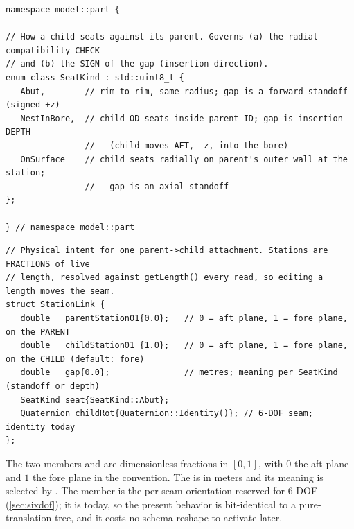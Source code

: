 \begin{listing}[htbp]
\begin{verbatim}
namespace model::part {

// How a child seats against its parent. Governs (a) the radial compatibility CHECK
// and (b) the SIGN of the gap (insertion direction).
enum class SeatKind : std::uint8_t {
   Abut,        // rim-to-rim, same radius; gap is a forward standoff (signed +z)
   NestInBore,  // child OD seats inside parent ID; gap is insertion DEPTH
                //   (child moves AFT, -z, into the bore)
   OnSurface    // child seats radially on parent's outer wall at the station;
                //   gap is an axial standoff
};

} // namespace model::part
\end{verbatim}
\caption{The  enum: three radial relationships, governing the radial check and the
gap sign.}\label{lst:seatkind}
\end{listing}

\begin{listing}[htbp]
\begin{verbatim}
// Physical intent for one parent->child attachment. Stations are FRACTIONS of live
// length, resolved against getLength() every read, so editing a length moves the seam.
struct StationLink {
   double   parentStation01{0.0};   // 0 = aft plane, 1 = fore plane, on the PARENT
   double   childStation01 {1.0};   // 0 = aft plane, 1 = fore plane, on the CHILD (default: fore)
   double   gap{0.0};               // metres; meaning per SeatKind (standoff or depth)
   SeatKind seat{SeatKind::Abut};
   Quaternion childRot{Quaternion::Identity()}; // 6-DOF seam; identity today
};
\end{verbatim}
\caption{The  struct: two fractional stations, an axial gap, a ,
and a (currently identity) seam rotation.}\label{lst:stationlink}
\end{listing}

The two members  and  are dimensionless fractions in
$[0,1]$, with $0$ the aft plane and $1$ the fore plane in the \zfwd{} convention. The  is
in meters and its meaning is selected by . The  member is the per-seam
orientation reserved for 6-DOF (\cref{sec:sixdof}); it is  today, so
the present behavior is bit-identical to a pure-translation tree, and it costs no schema reshape to
activate later.

